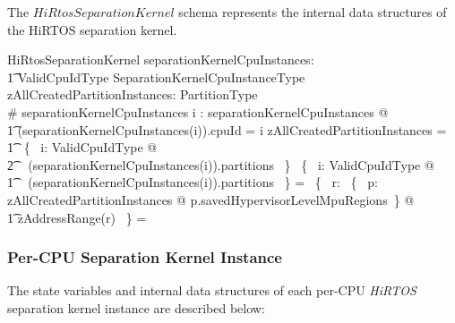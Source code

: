 \documentclass[11pt,letterpaper,twoside,openany]{book}
\begin{document}
The $HiRtosSeparationKernel$ schema represents the internal data
structures of the HiRTOS separation kernel.

\begin{schema}{HiRtosSeparationKernel}
    separationKernelCpuInstances: \\
    \t1 ValidCpuIdType \finj SeparationKernelCpuInstanceType \\
    zAllCreatedPartitionInstances: \finset PartitionType \\
\where
    \# separationKernelCpuInstances 
\also
    \forall i : \dom separationKernelCpuInstances @ \\
\t1   (separationKernelCpuInstances(i)).cpuId = i
\also
    zAllCreatedPartitionInstances = \\
\t1    \bigcup~\{~ i: ValidCpuIdType @ \\
\t2    \ran~ (separationKernelCpuInstances(i)).partitions ~\}
\also
    \bigcap~\{~ i: ValidCpuIdType @ \\
\t1    \ran~ (separationKernelCpuInstances(i)).partitions ~\} = \emptyset
\also
    \bigcap~\{~ r: \bigcup~\{~ p: zAllCreatedPartitionInstances @ p.savedHypervisorLevelMpuRegions~\} @ \\
    \t1 zAddressRange(r) ~\} = \emptyset
\end{schema}

\subsubsection{Per-CPU Separation Kernel Instance}

The state variables and internal data structures of each per-CPU \emph{HiRTOS} separation kernel instance
are described below:
\end{document}
